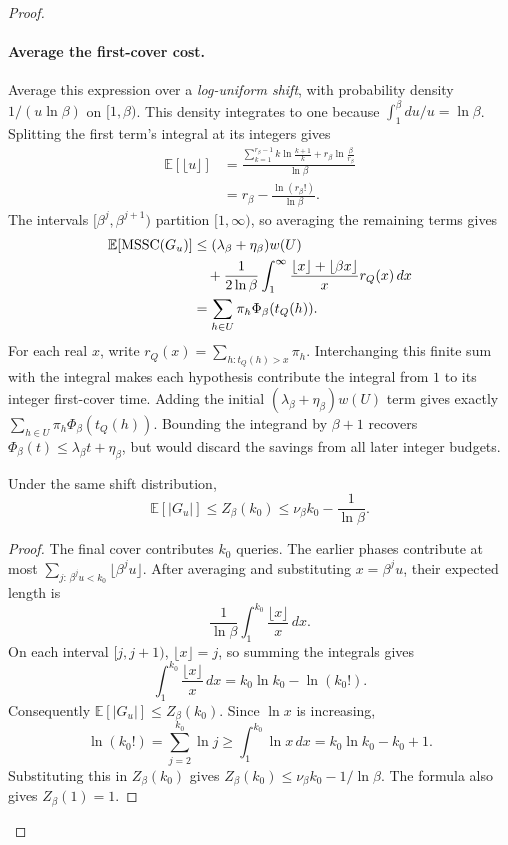 \begin{proof}
\paragraph{Average the first-cover cost.}
Average this expression over a \emph{log-uniform shift}, with
probability density $1/(u\ln\beta)$ on $[1,\beta)$. This density
integrates to one because $\int_1^\beta du/u=\ln\beta$.
Splitting the first term's integral at its integers
gives
\[
 \begin{aligned}
 \mathbb E[\lfloor u\rfloor]
 &=\frac{\displaystyle
     \sum_{k=1}^{r_\beta-1}k\ln\frac{k+1}{k}
        +r_\beta\ln\frac{\beta}{r_\beta}}{\ln\beta}\\
 &=r_\beta-\frac{\ln(r_\beta!)}{\ln\beta}.
 \end{aligned}
\]
The intervals $[\beta^j,\beta^{j+1})$ partition $[1,\infty)$,
so averaging the remaining terms gives
\[
 \begin{aligned}
 \mathbb E[\operatorname{MSSC}(G_u)]
 &\le(\lambda_\beta+\eta_\beta)w(U)\\
 &\quad+\frac1{2\ln\beta}\int_1^\infty
      \frac{\lfloor x\rfloor+\lfloor\beta x\rfloor}{x}
      r_Q(x)\,dx\\
 &=\sum_{h\in U}\pi_h\Phi_\beta(t_Q(h)).
 \end{aligned}
\]
For each real $x$, write
$r_Q(x)=\sum_{h:t_Q(h)>x}\pi_h$. Interchanging this finite sum
with the integral makes each hypothesis contribute the integral
from $1$ to its integer first-cover time. Adding the initial
$(\lambda_\beta+\eta_\beta)w(U)$ term gives exactly
$\sum_{h\in U}\pi_h\Phi_\beta(t_Q(h))$.
Bounding the integrand by $\beta+1$ recovers
$\Phi_\beta(t)\le\lambda_\beta t+\eta_\beta$, but would discard
the savings from all later integer budgets.

\begin{claim}
Under the same shift distribution,
\[
 \mathbb E[|G_u|]\le Z_\beta(k_0)
 \le\nu_\beta k_0-\frac1{\ln\beta}.
\]
\end{claim}
\begin{proof}
The final cover contributes $k_0$ queries. The earlier phases
contribute at most
$\sum_{j:\,\beta^ju<k_0}\lfloor\beta^ju\rfloor$.
After averaging and substituting $x=\beta^ju$, their expected
length is
\[
 \frac1{\ln\beta}\int_1^{k_0}\frac{\lfloor x\rfloor}{x}\,dx.
\]
On each interval $[j,j+1)$, $\lfloor x\rfloor=j$, so summing the
integrals gives
\[
 \int_1^{k_0}\frac{\lfloor x\rfloor}{x}\,dx
 =k_0\ln k_0-\ln(k_0!).
\]
Consequently $\mathbb E[|G_u|]\le Z_\beta(k_0)$. Since $\ln x$
is increasing,
\[
 \ln(k_0!)=\sum_{j=2}^{k_0}\ln j
 \ge\int_1^{k_0}\ln x\,dx
 =k_0\ln k_0-k_0+1.
\]
Substituting this in $Z_\beta(k_0)$ gives
$Z_\beta(k_0)\le\nu_\beta k_0-1/\ln\beta$. The formula also gives
$Z_\beta(1)=1$.
\end{proof}


\end{proof}
